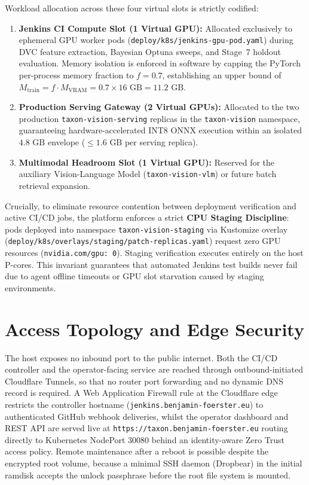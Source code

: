 Workload allocation across these four virtual slots is strictly codified:
\begin{enumerate}
    \item \textbf{Jenkins CI Compute Slot (1 Virtual GPU):} Allocated exclusively to ephemeral GPU worker pods (\nolinkurl{deploy/k8s/jenkins-gpu-pod.yaml}) during DVC feature extraction, Bayesian Optuna sweeps, and Stage~7 holdout evaluation. Memory isolation is enforced in software by capping the PyTorch per-process memory fraction to $f = 0.7$, establishing an upper bound of $M_{\text{train}} = f \cdot M_{\text{VRAM}} = 0.7 \times 16\text{ GB} = 11.2\text{ GB}$.
    \item \textbf{Production Serving Gateway (2 Virtual GPUs):} Allocated to the two production \texttt{taxon-vision-serving} replicas in the \texttt{taxon-vision} namespace, guaranteeing hardware-accelerated INT8 ONNX execution within an isolated $4.8\text{ GB}$ envelope ($\le 1.6\text{ GB}$ per serving replica).
    \item \textbf{Multimodal Headroom Slot (1 Virtual GPU):} Reserved for the auxiliary Vision-Language Model (\texttt{taxon-vision-vlm}) or future batch retrieval expansion.
\end{enumerate}

Crucially, to eliminate resource contention between deployment verification and active CI/CD jobs, the platform enforces a strict \textbf{CPU Staging Discipline}: pods deployed into namespace \texttt{taxon-\allowbreak vision-\allowbreak staging} via Kustomize overlay (\texttt{deploy/k8s/overlays/}\allowbreak\texttt{staging/}\allowbreak\texttt{patch-replicas.yaml}) request zero GPU resources (\texttt{nvidia.com/gpu: 0}). Staging verification executes entirely on the host P-cores. This invariant guarantees that automated Jenkins test builds never fail due to agent offline timeouts or GPU slot starvation caused by staging environments.

\section{Access Topology and Edge Security}
\label{sec:access_topology}

The host exposes no inbound port to the public internet. Both the CI/CD controller and the operator-facing service are reached through outbound-initiated Cloudflare Tunnels, so that no router port forwarding and no dynamic DNS record is required. A Web Application Firewall rule at the Cloudflare edge restricts the controller hostname (\texttt{jenkins.benjamin-foerster.eu}) to authenticated GitHub webhook deliveries, whilst the operator dashboard and REST API are served live at \texttt{https://taxon.benjamin-foerster.eu} routing directly to Kubernetes NodePort 30080 behind an identity-aware Zero Trust access policy. Remote maintenance after a reboot is possible despite the encrypted root volume, because a minimal SSH daemon (Dropbear) in the initial ramdisk accepts the unlock passphrase before the root file system is mounted.

